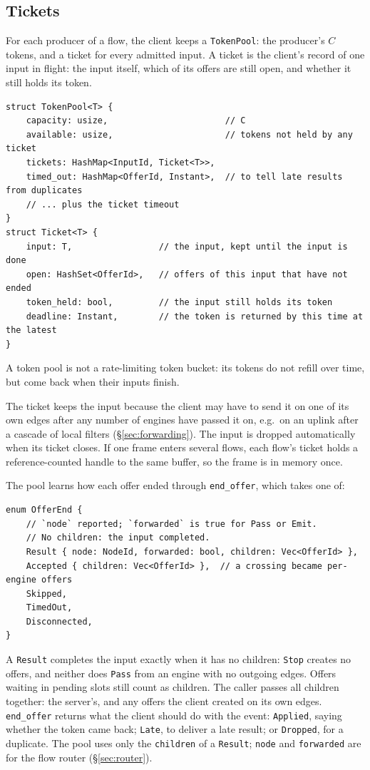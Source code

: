 \documentclass[11pt]{article}
\newcommand{\code}[1]{\texttt{#1}}
\begin{document}
\subsection{Tickets}

For each producer of a flow, the client keeps a \code{TokenPool}: the
producer's $C$ tokens, and a ticket for every admitted input. A ticket is the
client's record of one input in flight: the input itself, which of its offers
are still open, and whether it still holds its token.
\begin{lstlisting}
struct TokenPool<T> {
    capacity: usize,                       // C
    available: usize,                      // tokens not held by any ticket
    tickets: HashMap<InputId, Ticket<T>>,
    timed_out: HashMap<OfferId, Instant>,  // to tell late results from duplicates
    // ... plus the ticket timeout
}
struct Ticket<T> {
    input: T,                 // the input, kept until the input is done
    open: HashSet<OfferId>,   // offers of this input that have not ended
    token_held: bool,         // the input still holds its token
    deadline: Instant,        // the token is returned by this time at the latest
}
\end{lstlisting}
A token pool is not a rate-limiting token bucket: its tokens do not refill
over time, but come back when their inputs finish.

The ticket keeps the input because the client may have to send it on one of its
own edges after any number of engines have passed it on, e.g.\ on an uplink
after a cascade of local filters (\S\ref{sec:forwarding}). The input is
dropped automatically when its ticket closes. If one frame enters several
flows, each flow's ticket holds a reference-counted handle to the same buffer,
so the frame is in memory once.

The pool learns how each offer ended through \code{end\_offer}, which takes
one of:
\begin{lstlisting}
enum OfferEnd {
    // `node` reported; `forwarded` is true for Pass or Emit.
    // No children: the input completed.
    Result { node: NodeId, forwarded: bool, children: Vec<OfferId> },
    Accepted { children: Vec<OfferId> },  // a crossing became per-engine offers
    Skipped,
    TimedOut,
    Disconnected,
}
\end{lstlisting}
A \code{Result} completes the input exactly when it has no children:
\code{Stop} creates no offers, and neither does \code{Pass} from an engine
with no outgoing edges. Offers waiting in pending slots still count as
children. The caller passes all children together: the server's, and any
offers the client created on its own edges. \code{end\_offer} returns what the
client should do with the event: \code{Applied}, saying whether the token came
back; \code{Late}, to deliver a late result; or \code{Dropped}, for a duplicate.
The pool uses only the \code{children} of a \code{Result}; \code{node} and
\code{forwarded} are for the flow router (\S\ref{sec:router}).
\end{document}

